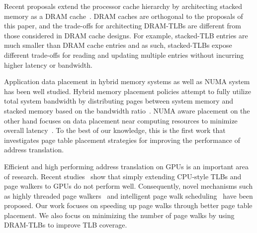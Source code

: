 
 Recent proposals extend the
processor cache hierarchy by architecting stacked memory as a DRAM
cache~\cite{BEAR, moin2012, unison, loh2011, jaewoong2012,
dramcache-resilient}. DRAM caches are orthogonal to the proposals 
of this paper, and the trade-offs for architecting DRAM-TLBs are
different from those considered in DRAM cache designs. For example,
stacked-TLB entries are much smaller than DRAM cache entries and as such,
stacked-TLBs expose different trade-offs for reading and updating
multiple entries without incurring higher latency or bandwidth.

 Application data
placement in hybrid memory systems as well as NUMA system has been
well studied. Hybrid memory placement policies attempt to fully
utilize total system bandwidth by distributing pages between system
memory and stacked memory based on the bandwidth
ratio~\cite{bwa,batman}. NUMA aware placement on the other hand
focuses on data placement near computing resources to minimize overall
latency~\cite{numa-traffic, numa-OSsupport, numa-bolosky}. To the best
of our knowledge, this is the first work that investigates page table
placement strategies for improving the performance of address
translation. 

 Efficient and high
performing address translation on GPUs is an important area of
research. Recent studies~\cite{power2014supporting, pichaigpu} show
that simply extending CPU-style TLBs and page walkers to GPUs do not
perform well. Consequently, novel mechanisms such as highly
threaded page walkers~\cite{power2014supporting} and intelligent page
walk scheduling~\cite{pichaigpu} have been proposed. Our work focuses
on speeding up page walks through better page table placement.  We also
focus on minimizing the number of page walks by using DRAM-TLBs to
improve TLB coverage.

